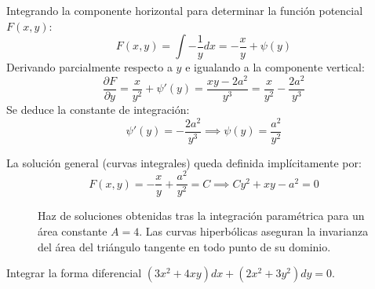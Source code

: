 \begin{tcolorbox}
Integrando la componente horizontal para determinar la función potencial $F(x,y)$:
$$ F(x,y) = \int -\frac{1}{y}dx = -\frac{x}{y} + \psi(y) $$
Derivando parcialmente respecto a $y$ e igualando a la componente vertical:
$$ \frac{\partial F}{\partial y} = \frac{x}{y^2} + \psi'(y) = \frac{xy - 2a^2}{y^3} = \frac{x}{y^2} - \frac{2a^2}{y^3} $$
Se deduce la constante de integración:
$$ \psi'(y) = -\frac{2a^2}{y^3} \implies \psi(y) = \frac{a^2}{y^2} $$

La solución general (curvas integrales) queda definida implícitamente por:
$$ F(x,y) = -\frac{x}{y} + \frac{a^2}{y^2} = C \implies Cy^2 + xy - a^2 = 0 $$

\begin{figure}[H]
    \centering
    
    \caption{Haz de soluciones obtenidas tras la integración paramétrica para un área constante $A=4$. Las curvas hiperbólicas aseguran la invarianza del área del triángulo tangente en todo punto de su dominio.}
\end{figure}
\end{tcolorbox}

\begin{ejercicio}
Integrar la forma diferencial $(3x^2 + 4xy)dx + (2x^2 + 3y^2)dy = 0$.
\end{ejercicio}

